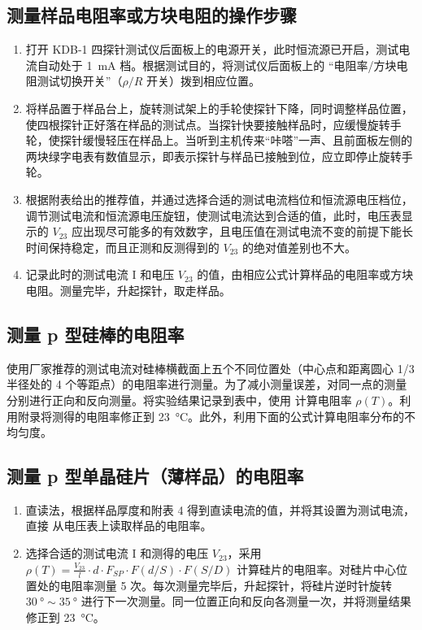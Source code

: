 \documentclass[a4paper,utf8]{article}
\begin{document}
    \subsection{测量样品电阻率或方块电阻的操作步骤}
    \begin{enumerate}
        \item 打开 KDB-1 四探针测试仪后面板上的电源开关，此时恒流源已开启，测试电流自动处于 \SI{1}{\milli\ampere} 档。根据测试目的，将测试仪后面板上的 “电阻率/方块电阻测试切换开关”（$\rho/R$ 开关）拨到相应位置。
        \item 将样品置于样品台上，旋转测试架上的手轮使探针下降，同时调整样品位置，使四根探针正好落在样品的测试点。当探针快要接触样品时，应缓慢旋转手轮，使探针缓慢轻压在样品上。当听到主机传来“咔嗒”一声、且前面板左侧的两块绿字电表有数值显示，即表示探针与样品已接触到位，应立即停止旋转手轮。
        \item 根据附表给出的推荐值，并通过选择合适的测试电流档位和恒流源电压档位，调节测试电流和恒流源电压旋钮，使测试电流达到合适的值，此时，电压表显示的 $V_{23}$ 应出现尽可能多的有效数字，且电压值在测试电流不变的前提下能长时间保持稳定，而且正测和反测得到的 $V_{23}$ 的绝对值差别也不大。
        \item 记录此时的测试电流 I 和电压 $V_{23}$ 的值，由相应公式计算样品的电阻率或方块电阻。测量完毕，升起探针，取走样品。
    \end{enumerate}
    \subsection{测量 p 型硅棒的电阻率}
        使用厂家推荐的测试电流对硅棒横截面上五个不同位置处（中心点和距离圆心 1/3 半径处的 4 个等距点）的电阻率进行测量。为了减小测量误差，对同一点的测量分别进行正向和反向测量。将实验结果记录到表中，使用 计算电阻率 $\rho (T)$。利用附录将测得的电阻率修正到 \SI{23}{\degreeCelsius}。此外，利用下面的公式计算电阻率分布的不均匀度。
    \subsection{测量 p 型单晶硅片（薄样品）的电阻率}
        \begin{enumerate}
            \item 直读法，根据样品厚度和附表 4 得到直读电流的值，并将其设置为测试电流，直接
            从电压表上读取样品的电阻率。
            \item 选择合适的测试电流 I 和测得的电压 $V_{23}$，采用 $\rho(T)=\frac{V_{23}}l\cdot d\cdot F_{SP}\cdot F(d/S)\cdot F(S/D)$ 计算硅片的电阻率。对硅片中心位置处的电阻率测量 5 次。每次测量完毕后，升起探针，将硅片逆时针旋转 $\SI{30}{\degree} \sim  \SI{35}{\degree}$ 进行下一次测量。同一位置正向和反向各测量一次，并将测量结果修正到 \SI{23}{\degreeCelsius}。
        \end{enumerate}
\end{document}
